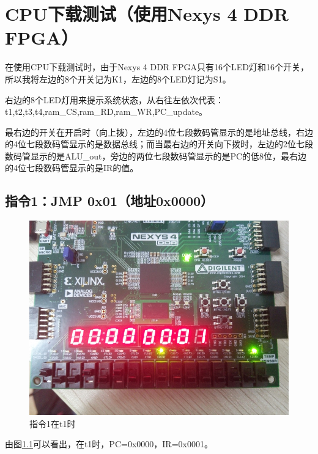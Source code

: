 \documentclass[forprint]{WHUBachelor}
\begin{document}
\chapter{CPU下载测试（使用Nexys 4 DDR FPGA）}

在使用CPU下载测试时，由于Nexys 4 DDR FPGA只有16个LED灯和16个开关，所以我将左边的8个开关记为K1，左边的8个LED灯记为S1。

右边的8个LED灯用来提示系统状态，从右往左依次代表：t1,t2,t3,t4,ram\_CS,ram\_RD,ram\_WR,PC\_update。

最右边的开关在开启时（向上拨），左边的4位七段数码管显示的是地址总线，右边的4位七段数码管显示的是数据总线；而当最右边的开关向下拨时，左边的2位七段数码管显示的是ALU\_out，旁边的两位七段数码管显示的是PC的低8位，最右边的4位七段数码管显示的是IR的值。

\section{指令1：JMP 0x01（地址0x0000）}


\begin{figure}[H]
  \centering
  \includegraphics[width=5in]{figures/download/00.jpg}
  \caption{指令1在t1时}
  \label{fig:down:00}
\end{figure}

由图\ref{fig:down:00}可以看出，在t1时，PC=0x0000，IR=0x0001。
\end{document}
